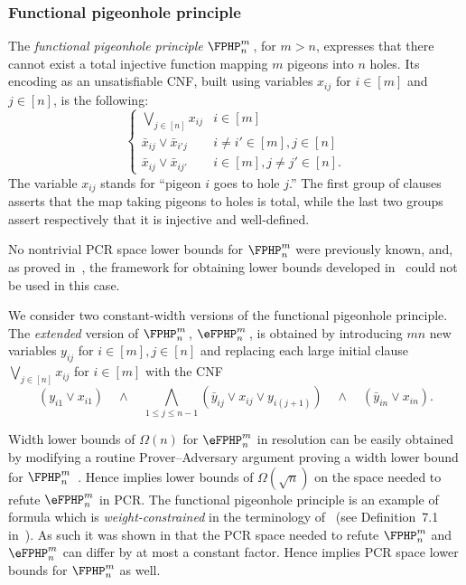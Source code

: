 \documentclass{toc}
\begin{document}
\subsubsection{Functional pigeonhole principle}
The \emph{functional pigeonhole principle} $\FPHP^m_n$\,, for $m > n$, 
expresses that there cannot exist a total injective function mapping $m$ pigeons into $n$ holes. 
Its encoding as an unsatisfiable CNF, built using variables $x_{ij}$ for $i\in[m]$ and $j\in [n]$, is the following:
$$
\left \{
\begin{array}{ll}
\bigvee_{j\in[n]}x_{ij}  & i \in [m]   \\
\bar x_{ij} \vee \bar x_{i'j}  & i \not = i' \in [m],  j\in[n] \\
\bar x_{ij} \vee \bar x_{ij'}& i \in [m],  j \not = j'\in[n].
\end{array}
\right.
$$
The variable $x_{ij}$ stands for ``pigeon $i$ goes to hole $j$.''
The first group of clauses
asserts that the map taking pigeons to holes is total, 
while the last two groups assert
respectively that it is injective and well-defined.%

No nontrivial PCR 
space lower bounds for $\FPHP^m_n$ were previously known,  
and, as proved in~\cite{DBLP:conf/icalp/FilmusLMNV13},
the framework for obtaining lower bounds developed in~\cite{DBLP:journals/jacm/BonacinaG15} could not be used in this case.

We consider two constant-width versions of the functional pigeonhole principle. 
The \emph{extended} version of $\FPHP^m_n$\,, 
$\eFPHP^m_n$\,, is obtained by 
introducing $mn$ new variables  $y_{ij}$ for $i\in[m], j\in[n]$
and
replacing each large initial clause $\bigvee_{j\in[n]}x_{ij}$  for \mbox{$i \in [m]$}
with the CNF
\[
(y_{i1} \vee x_{i1})
\quad \wedge \quad
\bigwedge_{1 \leq  j \leq n-1} (\bar y_{ij} \vee x_{ij} \vee y_{i(j+1)})  
\quad \wedge \quad
 (\bar y_{in} \vee x_{in}).
\]

Width lower bounds of $\Omega(n)$ for  $\eFPHP^m_n$ in resolution can be easily obtained by modifying a routine Prover--Adversary argument
proving a width lower bound for $\FPHP^m_n$~\cite{DBLP:journals/jcss/AtseriasD08}.
Hence  implies lower bounds of $\Omega(\sqrt{n})$ 
on the space needed to refute $\eFPHP^m_n$ in PCR.  
The functional pigeonhole principle is an example of formula which is 
 \emph{weight-constrained} in the terminology of~\cite{DBLP:journals/siamcomp/FilmusLNRT15} 
 (see Definition~7.1 in~\cite{DBLP:journals/siamcomp/FilmusLNRT15}).
As such it was shown in \cite[Theorem 1.5]{DBLP:journals/siamcomp/FilmusLNRT15}
that the PCR space needed to refute $\FPHP^m_n$ and $\eFPHP^m_n$ can differ by at most a constant factor. 
Hence  implies PCR space lower bounds for $\FPHP^m_n$ as well.
\end{document}
